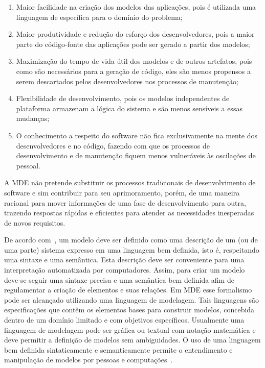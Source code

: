 \begin{enumerate}
	\item Maior facilidade na criação dos modelos das aplicações, pois é utilizada uma linguagem de específica para o domínio do problema;
	\item Maior produtividade e redução do esforço dos desenvolvedores, pois a maior parte do código-fonte das aplicações pode ser gerado a partir dos modelos;
	\item Maximização do tempo de vida útil dos modelos e de outros artefatos, pois como são necessários para a geração de código, eles são menos propensos a serem descartados pelos desenvolvedores nos processos de manutenção;
	\item Flexibilidade de desenvolvimento, pois os modelos independentes de plataforma armazenam a lógica do sistema e são menos sensíveis a essas mudanças;
	\item O conhecimento a respeito do software não fica exclusivamente na mente dos desenvolvedores e no código, fazendo com que os processos de desenvolvimento e de manutenção fiquem menos vulneráveis às oscilações de pessoal.
\end{enumerate}

A MDE não pretende substituir os processos tradicionais de desenvolvimento de software e sim contribuir para seu aprimoramento, porém, de uma maneira racional para mover informações de uma fase de desenvolvimento para outra, trazendo respostas rápidas e eficientes para atender as necessidades inesperadas de novos requisitos.

De acordo com~, um modelo deve ser definido como uma descrição de um (ou de uma parte) sistema expresso em uma linguagem bem definida, isto é, respeitando uma sintaxe e uma semântica. Esta descrição deve ser conveniente para uma interpretação automatizada por computadores. Assim, para criar um modelo deve-se seguir uma sintaxe precisa e uma semântica bem definida afim de regulamentar a criação de elementos e suas relações. Em MDE esse formalismo pode ser alcançado utilizando uma linguagem de modelagem. Tais linguagens são especificações que contêm os elementos bases para construir modelos, concebida dentro de um domínio limitado e com objetivos específicos. Usualmente uma linguagem de modelagem pode ser gráfica ou textual com notação matemática e deve permitir a definição de modelos sem ambiguidades. O uso de uma linguagem bem definida sintaticamente e semanticamente permite o entendimento e manipulação de modelos por pessoas e computações~\cite{Hutchinson_2011, France_2007, Schmidt_2006}.

